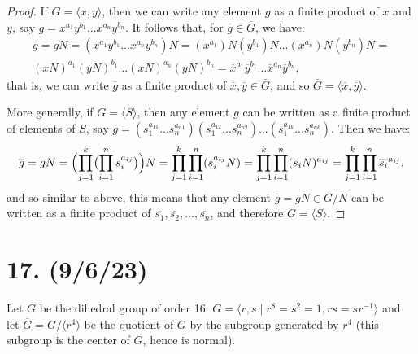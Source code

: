 \documentclass{article}
\begin{document}
\begin{proof}
    If $G = \langle x, y \rangle$, then we can write any element $g$ as a finite product of $x$ and $y$, say $g = x^{a_1} y^{b_1} ... x^{a_n} y^{b_n}$. It follows that, for $\overline{g} \in \overline{G}$, we have:
    \begin{multline*}
        \overline{g} = gN = (x^{a_1} y^{b_1} ... x^{a_n} y^{b_n})N = (x^{a_1})N (y^{b_1})N ... (x^{a_n})N (y^{b_n})N = \\ (xN)^{a_1} (yN)^{b_1} ... (xN)^{a_n} (yN)^{b_n} = \overline{x}^{a_1} \overline{y}^{b_1} ... \overline{x}^{a_n} \overline{y}^{b_n},
    \end{multline*}
    that is, we can write $\overline{g}$ as a finite product of $\overline{x}, \overline{y} \in \overline{G}$, and so $\overline{G} = \langle \overline{x}, \overline{y} \rangle$.

    More generally, if $G = \langle S \rangle$, then any element $g$ can be written as a finite product of elements of $S$, say $g = (s_1^{a_{11}}...s_n^{a_{n1}})(s_1^{a_{12}}...s_n^{a_{n2}})...(s_1^{a_{1k}}...s_n^{a_{nk}})$. Then we have:
    \begin{equation*}
        \overline{g} = gN = \Bigl( \prod_{j = 1}^{k} \bigl(\prod_{i = 1}^{n} s_i^{a_{ij}}\bigr) \Bigr) N = \prod_{j = 1}^{k} \prod_{i = 1}^{n} (s_i^{a_{ij}} N) = \prod_{j = 1}^{k} \prod_{i = 1}^{n} (s_i N)^{a_{ij}} = \prod_{j = 1}^{k} \prod_{i = 1}^{n} \overline{s_i}^{a_{ij}},
    \end{equation*}
    and so similar to above, this means that any element $\overline{g} = gN \in G/N$ can be written as a finite product of $\overline{s_1}, \overline{s_2}, ..., \overline{s_n}$, and therefore $\overline{G} = \langle \overline{S} \rangle$.
\end{proof}

\section*{17. (9/6/23)}

Let $G$ be the dihedral group of order 16: $G = \langle r, s \mid r^8 = s^2 = 1, rs = sr^{-1} \rangle$ and let $\overline{G} = G/\langle r^4 \rangle$ be the quotient of $G$ by the subgroup generated by $r^4$ (this subgroup is the center of $G$, hence is normal).
\end{document}
